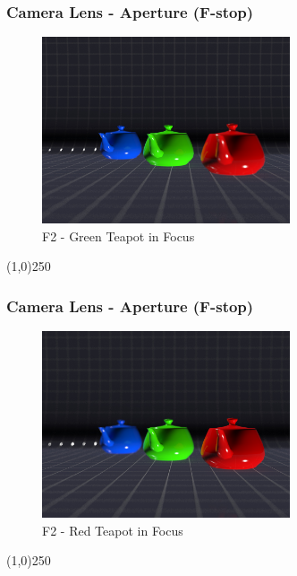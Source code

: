\begin{frame}
\frametitle{Camera Lens - Aperture (F-stop)}
\begin{figure}
	\centering
	\includegraphics[height=5.5cm]{img/Cameras/GreenTeapot.jpg}
	\caption[F2 - Green Teapot in Focus]{F2 - Green Teapot in Focus}
	\label{fig:GreenTeaPot}
\end{figure}
\end{frame}
\begin{center}\line(1,0){250}\end{center}


\begin{frame}
\frametitle{Camera Lens - Aperture (F-stop)}
\begin{figure}
	\centering
	\includegraphics[height=5.5cm]{img/Cameras/RedTeapot.jpg}
	\caption[F2 - Red Teapot in Focus]{F2 - Red Teapot in Focus}
	\label{fig:BlueTeaPot}
\end{figure}
\end{frame}
\begin{center}\line(1,0){250}\end{center}







\newpage

%



%
%
\nocite{*}


\newpage

\printindex
\newpage






